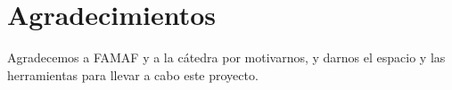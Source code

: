\documentclass[aps,twocolumn,groupedaddress]{revtex4-2}
\begin{document}

\section{Agradecimientos}
Agradecemos a FAMAF y a la cátedra por motivarnos, y darnos el espacio y las herramientas para llevar a cabo este proyecto. 



\end{document}
